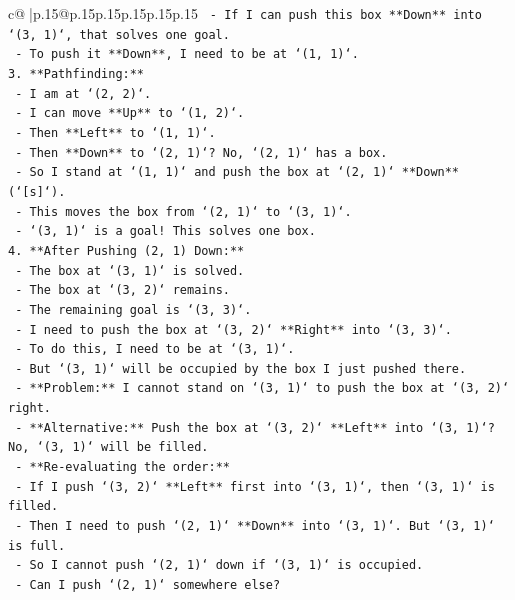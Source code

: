 \documentclass{article}
\begin{document}
{\begin{supertabular}{c@{$\;$}|p{.15\linewidth}@{}p{.15\linewidth}p{.15\linewidth}p{.15\linewidth}p{.15\linewidth}p{.15\linewidth}}
{{{\texttt{    {-}   If I can push this box **Down** into `(3, 1)`, that solves one goal.} \\
\texttt{    {-}   To push it **Down**, I need to be at `(1, 1)`.} \\
\texttt{3.  **Pathfinding:**} \\
\texttt{    {-}   I am at `(2, 2)`.} \\
\texttt{    {-}   I can move **Up** to `(1, 2)`.} \\
\texttt{    {-}   Then **Left** to `(1, 1)`.} \\
\texttt{    {-}   Then **Down** to `(2, 1)`? No, `(2, 1)` has a box.} \\
\texttt{    {-}   So I stand at `(1, 1)` and push the box at `(2, 1)` **Down** (`{[}s{]}`).} \\
\texttt{    {-}   This moves the box from `(2, 1)` to `(3, 1)`.} \\
\texttt{    {-}   `(3, 1)` is a goal! This solves one box.} \\
\texttt{4.  **After Pushing (2, 1) Down:**} \\
\texttt{    {-}   The box at `(3, 1)` is solved.} \\
\texttt{    {-}   The box at `(3, 2)` remains.} \\
\texttt{    {-}   The remaining goal is `(3, 3)`.} \\
\texttt{    {-}   I need to push the box at `(3, 2)` **Right** into `(3, 3)`.} \\
\texttt{    {-}   To do this, I need to be at `(3, 1)`.} \\
\texttt{    {-}   But `(3, 1)` will be occupied by the box I just pushed there.} \\
\texttt{    {-}   **Problem:** I cannot stand on `(3, 1)` to push the box at `(3, 2)` right.} \\
\texttt{    {-}   **Alternative:** Push the box at `(3, 2)` **Left** into `(3, 1)`? No, `(3, 1)` will be filled.} \\
\texttt{    {-}   **Re{-}evaluating the order:**} \\
\texttt{        {-}   If I push `(3, 2)` **Left** first into `(3, 1)`, then `(3, 1)` is filled.} \\
\texttt{        {-}   Then I need to push `(2, 1)` **Down** into `(3, 1)`. But `(3, 1)` is full.} \\
\texttt{        {-}   So I cannot push `(2, 1)` down if `(3, 1)` is occupied.} \\
\texttt{        {-}   Can I push `(2, 1)` somewhere else?} \\
}}}
\end{supertabular}}
\end{document}
